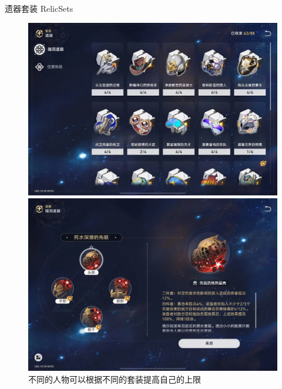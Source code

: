 \documentclass{beamer}
\begin{document}
\begin{frame}{遗器套装 RelicSets}
    \begin{figure}
        \centering
        \begin{minipage}[c]{0.48\textwidth}
            \centering
            \includegraphics[width=\textwidth, height=0.7\textheight, keepaspectratio]{img/17a0984074ed94a8bef60ce68ae7e3e.jpg}
        \end{minipage}
        \hfill  %
        \begin{minipage}[c]{0.48\textwidth}
            \centering
            \includegraphics[width=\textwidth, height=0.7\textheight, keepaspectratio]{img/13c8cb9f4c585da93f382f1c3273bb5.jpg}
        \end{minipage}
        \caption{不同的人物可以根据不同的套装提高自己的上限}
        \label{fig:characters}
    \end{figure}
\end{frame}
\end{document}
